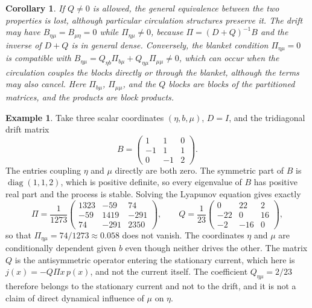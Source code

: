 \documentclass[11pt]{article}
\newtheorem{corollary}{Corollary}
\theoremstyle{definition}
\newtheorem{example}{Example}
\begin{document}
\begin{corollary}
If $Q\neq 0$ is allowed, the general equivalence between the two properties is lost, although particular circulation structures preserve it. The drift may have $B_{\eta\mu}=B_{\mu\eta}=0$ while $\Pi_{\eta\mu}\neq 0$, because $\Pi=(D+Q)^{-1}B$ and the inverse of $D+Q$ is in general dense. Conversely, the blanket condition $\Pi_{\eta\mu}=0$ is compatible with $B_{\eta\mu}=Q_{\eta b}\Pi_{b\mu}+Q_{\eta\mu}\Pi_{\mu\mu}\neq 0$, which can occur when the circulation couples the blocks directly or through the blanket, although the terms may also cancel. Here $\Pi_{b\mu}$, $\Pi_{\mu\mu}$, and the $Q$ blocks are blocks of the partitioned matrices, and the products are block products.
\end{corollary}

\begin{example}
Take three scalar coordinates $(\eta,b,\mu)$, $D=I$, and the tridiagonal drift matrix
\[
B=\begin{pmatrix} 1 & 1 & 0\\ -1 & 1 & 1\\ 0 & -1 & 2\end{pmatrix}.
\]
The entries coupling $\eta$ and $\mu$ directly are both zero. The symmetric part of $B$ is $\operatorname{diag}(1,1,2)$, which is positive definite, so every eigenvalue of $B$ has positive real part and the process is stable. Solving the Lyapunov equation gives exactly
\[
\Pi=\frac{1}{1273}\begin{pmatrix} 1323 & -59 & 74\\ -59 & 1419 & -291\\ 74 & -291 & 2350\end{pmatrix},
\qquad
Q=\frac{1}{23}\begin{pmatrix} 0 & 22 & 2\\ -22 & 0 & 16\\ -2 & -16 & 0\end{pmatrix},
\]
so that $\Pi_{\eta\mu}=74/1273\approx 0.058$ does not vanish. The coordinates $\eta$ and $\mu$ are conditionally dependent given $b$ even though neither drives the other. The matrix $Q$ is the antisymmetric operator entering the stationary current, which here is $j(x)=-Q\Pi x\,p(x)$, and not the current itself. The coefficient $Q_{\eta\mu}=2/23$ therefore belongs to the stationary current and not to the drift, and it is not a claim of direct dynamical influence of $\mu$ on $\eta$.
\end{example}
\end{document}
